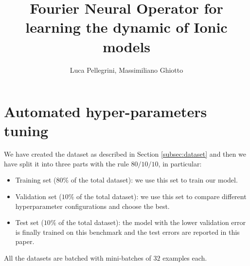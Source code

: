 \documentclass{article}
\title{Fourier Neural Operator for learning the dynamic of Ionic models}
\author{Luca Pellegrini, Massimiliano Ghiotto}
\begin{document}
\maketitle
\listoftodos

\section{Automated hyper-parameters tuning}
We have created the dataset as described in Section \ref{subsec:dataset} and then we have split it into three parts with the rule $80/10/10$, in particular:
\begin{itemize}
    \item Training set ($80\%$ of the total dataset): we use this set to train our model.
    \item Validation set ($10\%$ of the total dataset): we use this set to compare different hyperparameter configurations and choose the best.
    \item Test set ($10\%$ of the total dataset): the model with the lower validation error is finally trained on this benchmark and the test errors are reported in this paper.
\end{itemize}
All the datasets are batched with mini-batches of $32$ examples each.
\end{document}
